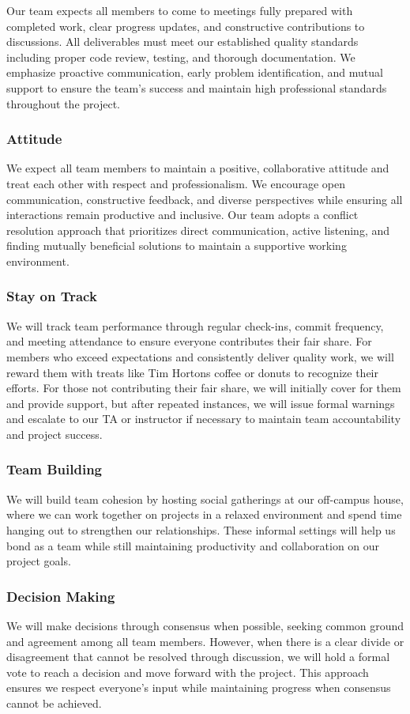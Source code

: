 \documentclass{article}
\begin{document}
Our team expects all members to come to meetings fully prepared with completed work, 
clear progress updates, and constructive contributions to discussions.
All deliverables must meet our established quality standards including proper code review, testing, and thorough documentation. 
We emphasize proactive communication, early problem identification, and mutual support to ensure the team's success and maintain high 
professional standards throughout the project.

\subsubsection*{Attitude}

We expect all team members to maintain a positive, collaborative attitude and treat each other with respect and professionalism. 
We encourage open communication, constructive feedback, and diverse perspectives while ensuring all interactions remain productive and inclusive. 
Our team adopts a conflict resolution approach that prioritizes direct communication, active listening, and finding mutually beneficial solutions to 
maintain a supportive working environment.

\subsubsection*{Stay on Track}

We will track team performance through regular check-ins, commit frequency, and meeting attendance to ensure everyone contributes their fair share. 
For members who exceed expectations and consistently deliver quality work, we will reward them with treats like Tim Hortons coffee or donuts to recognize their efforts. 
For those not contributing their fair share, we will initially cover for them and provide support, but after repeated instances, we will issue formal warnings and escalate 
to our TA or instructor if necessary to maintain team accountability and project success.

\subsubsection*{Team Building}

We will build team cohesion by hosting social gatherings at our off-campus house, where we can work together on projects in a relaxed environment and spend time hanging out
to strengthen our relationships. These informal settings will help us bond as a team while still maintaining productivity and collaboration on our project goals.

\subsubsection*{Decision Making} 

We will make decisions through consensus when possible, seeking common ground and agreement among all team members. However, when there is a clear divide or disagreement that 
cannot be resolved through discussion, we will hold a formal vote to reach a decision and move forward with the project. This approach ensures we respect everyone's input while 
maintaining progress when consensus cannot be achieved.
\end{document}

